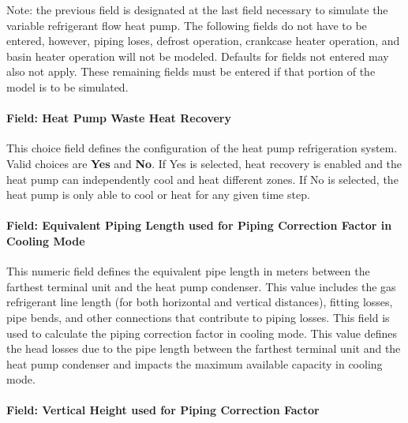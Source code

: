 Note: the previous field is designated at the last field necessary to simulate the variable refrigerant flow heat pump. The following fields do not have to be entered, however, piping loses, defrost operation, crankcase heater operation, and basin heater operation will not be modeled. Defaults for fields not entered may also not apply. These remaining fields must be entered if that portion of the model is to be simulated.

\paragraph{Field: Heat Pump Waste Heat Recovery}\label{field-heat-pump-waste-heat-recovery-000}

This choice field defines the configuration of the heat pump refrigeration system. Valid choices are \textbf{Yes} and \textbf{No}. If Yes is selected, heat recovery is enabled and the heat pump can independently cool and heat different zones. If No is selected, the heat pump is only able to cool or heat for any given time step.

\paragraph{Field: Equivalent Piping Length used for Piping Correction Factor in Cooling Mode}\label{field-equivalent-piping-length-used-for-piping-correction-factor-in-cooling-mode-000}

This numeric field defines the equivalent pipe length in meters between the farthest terminal unit and the heat pump condenser. This value includes the gas refrigerant line length (for both horizontal and vertical distances), fitting losses, pipe bends, and other connections that contribute to piping losses. This field is used to calculate the piping correction factor in cooling mode. This value defines the head losses due to the pipe length between the farthest terminal unit and the heat pump condenser and impacts the maximum available capacity in cooling mode.

\paragraph{Field: Vertical Height used for Piping Correction Factor}\label{field-vertical-height-used-for-piping-correction-factor-000}


